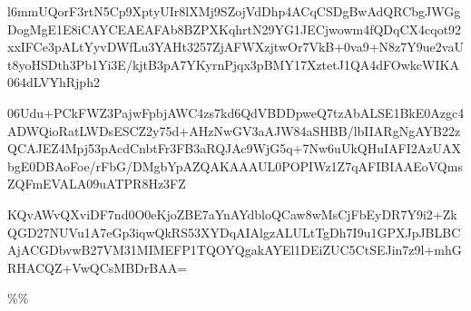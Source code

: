 \documentclass[]{article}
\newenvironment{Shaded}{\begin{snugshade}}{\end{snugshade}}
\newcommand{\NormalTok}[1]{#1}
\begin{document}
\begin{Shaded}
\begin{Highlighting}[]
\NormalTok{l6mmUQorF3rtN5Cp9XptyUIr8lXMj9SZojVdDhp4ACqCSDgBwAdQRCbgJWGgDogMgE1E8iCAYCEAEAFAb8BZPXKqhrtN29YG1JECjwowm4fQDqCX4cqot92xxIFCe3pALtYyvDWfLu3YAHt3257ZjAFWXzjtwOr7VkB+0va9+N8z7Y9ue2vaUt8yoHSDth3Pb1Yi3E/kjtB3pA7YKyrnPjqx3pBMY17XztetJ1QA4dFOwkcWIKA064dLVYhRjph2}

\NormalTok{06Udu+PCkFWZ3PajwFpbjAWC4zs7kd6QdVBDDpweQ7tzAbALSE1BkE0Azgc4ADWQioRatLWDsESCZ2y75d+AHzNwGV3aAJW84aSHBB/lbIIARgNgAYB22zQCAJEZ4Mpj53pAcdCnbtFr3FB3aRQJAc9WjG5q+7Nw6uUkQHuIAFI2AzUAXbgE0DBAoFoe/rFbG/DMgbYpAZQAKAAAUL0POPIWz1Z7qAFIBIAAEoVQmsZQFmEVALA09uATPR8Hz3FZ}

\NormalTok{KQvAWvQXviDF7nd0O0eKjoZBE7aYnAYdbloQCaw8wMsCjFbEyDR7Y9i2+ZkQGD27NUVu1A7eGp3iqwQkRS53XYDqAIAlgzALULtTgDh7I9u1GPXJpJBLBCAjACGDbvwB27VM31MIMEFP1TQOYQgakAYEl1DEiZUC5CtSEJin7z9l+mhGRHACQZ+VwQCsMBDrBAA=}
\end{Highlighting}
\end{Shaded}

\%\%
\end{document}
